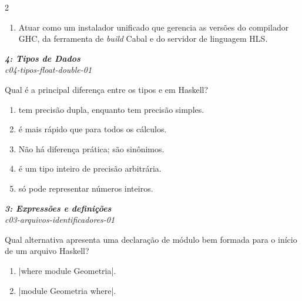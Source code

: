 \documentclass[a4paper,10pt,brazil]{article}
\begin{document}
\begin{multicols}{2}
\begin{enumerate}
  \item Atuar como um instalador unificado que gerencia as versões do compilador GHC, da ferramenta de \emph{build} Cabal e do servidor de linguagem HLS.


\end{enumerate}

\begin{flushright}
  \footnotesize
  \textit{\textbf{4: Tipos de Dados}}\\
  \textit{c04-tipos-float-double-01}\\

\end{flushright}
Qual é a principal diferença entre os tipos  e  em Haskell?

\begin{enumerate}
  \item {} tem precisão dupla, enquanto  tem precisão simples.

  \item {} é mais rápido que  para todos os cálculos.

  \item Não há diferença prática; são sinônimos.

  \item {} é um tipo inteiro de precisão arbitrária.

  \item {} só pode representar números inteiros.


\end{enumerate}

\begin{flushright}
  \footnotesize
  \textit{\textbf{3: Expressões e definições}}\\
  \textit{c03-arquivos-identificadores-01}\\

\end{flushright}
Qual alternativa apresenta uma declaração de módulo bem formada para o início de um arquivo Haskell?

\begin{enumerate}
  \item \haskellinline|where module Geometria|.

  \item \haskellinline|module Geometria where|.


\end{enumerate}
\end{multicols}
\end{document}

